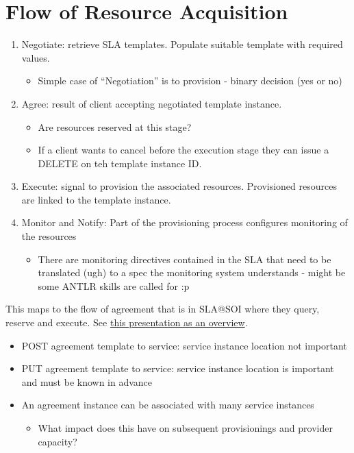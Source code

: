 \documentclass[12pt]{article}  %
\begin{document}
\section*{Flow of Resource Acquisition}
\begin{enumerate}
\item Negotiate: retrieve SLA templates. Populate suitable template with required values.
  \begin{itemize} 
  \item Simple case of “Negotiation” is to provision - binary decision (yes or no)
  \end{itemize}
\item Agree: result of client accepting negotiated template instance.
  \begin{itemize} 
  \item Are resources reserved at this stage?
  \item If a client wants to cancel before the execution stage they can issue a DELETE on teh template instance ID.
  \end{itemize}
\item Execute: signal to provision the associated resources. Provisioned resources are linked to the template instance.
\item Monitor and Notify: Part of the provisioning process configures monitoring of the resources
  \begin{itemize} 
  \item There are monitoring directives contained in the SLA that need to be translated (ugh) to a spec the monitoring system understands - might be some ANTLR skills are called for :p
  \end{itemize}
\end{enumerate}

This maps to the flow of agreement that is in SLA@SOI where they query, reserve and execute. See \href{http://dl.dropbox.com/u/165239/query-reservation.pptx}{this presentation as an overview}.

\begin{itemize}
   \item POST agreement template to service: service instance location not important
   \item PUT agreement template to service: service instance location is important and must be known in advance
   \item An agreement instance can be associated with many service instances
   \begin{itemize}
   \item What impact does this have on subsequent provisionings and provider capacity?
   \end{itemize}
\end{itemize}
\end{document}
